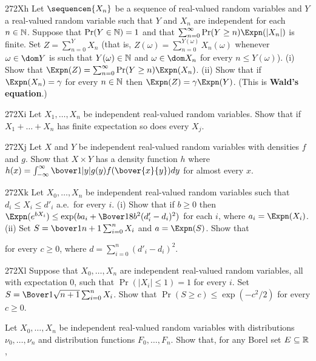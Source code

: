{\spheader 272Xh Let $\sequencen{X_n}$ be a sequence of
real-valued random variables and $Y$ a real-valued
random variable such that $Y$ and $X_n$ are independent for
each $n\in\Bbb N$.   Suppose that $\Pr(Y\in\Bbb N)=1$ and that
$\sum_{n=0}^{\infty}\Pr(Y\ge n)\Expn(|X_n|)$ is finite.   Set
$Z=\sum_{n=0}^YX_n$ (that is,
$Z(\omega)=\sum_{n=0}^{Y(\omega)}X_n(\omega)$ whenever $\omega\in\dom Y$
is such that $Y(\omega)\in\Bbb N$ and $\omega\in\dom X_n$ for every
$n\le Y(\omega)$).   (i) Show that
$\Expn(Z)=\sum_{n=0}^{\infty}\Pr(Y\ge n)\Expn(X_n)$.      (ii)
Show that if $\Expn(X_n)=\gamma$ for every $n\in\Bbb N$ then
$\Expn(Z)=\gamma\Expn(Y)$.   (This is {\bf Wald's equation}.)

\sqheader 272Xi Let $X_1,\ldots,X_n$ be independent real-valued random
variables.   Show that if $X_1+\ldots+X_n$ has finite expectation so
does every $X_j$.   

\sqheader 272Xj Let $X$ and $Y$ be independent real-valued random
variables with densities $f$ and $g$.   Show that $X\times Y$ has
a density function $h$ where
$h(x)=\int_{-\infty}^{\infty}\bover1{|y|}g(y)f(\bover{x}{y})dy$ for
almost every $x$.   

\spheader 272Xk Let
$X_0,\ldots,X_n$ be independent real-valued
random variables such that $d_i\le X_i\le d'_i$ a.e.\
for every $i$.   (i) Show that if $b\ge 0$ then
$\Expn(e^{bX_i})\le\exp(ba_i+\Bover18b^2(d'_i-d_i)^2)$ for each $i$,
where $a_i=\Expn(X_i)$.   (ii)
Set $S=\bover1{n+1}\sum_{i=0}^nX_i$ and $a=\Expn(S)$.   Show that


\noindent for every $c\ge 0$, where $d=\sum_{i=0}^n(d'_i-d_i)^2$.

\spheader 272Xl Suppose
that $X_0,\ldots,X_n$ are independent real-valued random
variables, all with expectation $0$, such that $\Pr(|X_i|\le 1)=1$ for
every $i$.   Set $S=\Bover1{\sqrt{n+1}}\sum_{i=0}^nX_i$.   Show that
$\Pr(S\ge c)\le\exp(-c^2/2)$ for every $c\ge 0$.

Let $X_0,\ldots,X_n$ be independent real-valued random
variables with distributions $\nu_0,\ldots,\nu_n$ and distribution
functions $F_0,\ldots,F_n$.   Show that, for any Borel set
$E\subseteq\Bbb R$,

}
